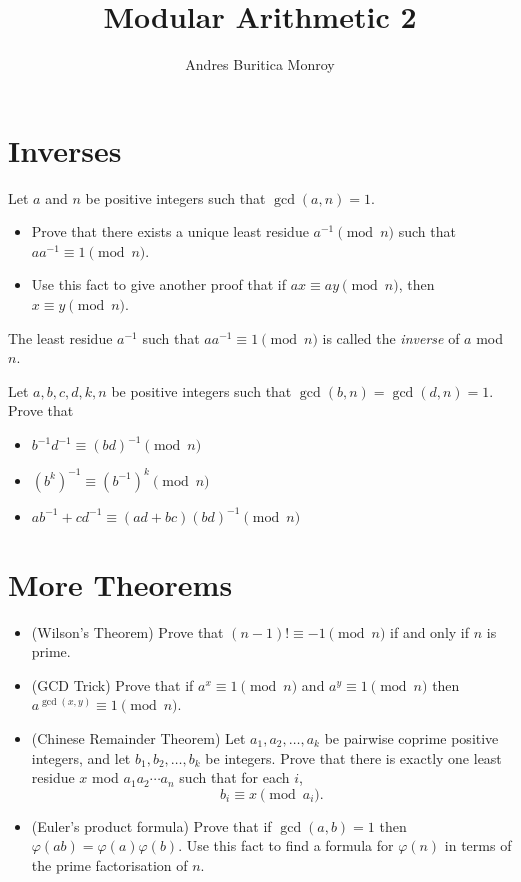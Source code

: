 \documentclass{article}
\title{Modular Arithmetic 2}
\author{Andres Buritica Monroy}
\date{}
\begin{document}
\maketitle
\section{Inverses}
  Let $a$ and $n$ be positive integers such that $\gcd(a,n)=1$.
  \begin{itemize}
    \item Prove that there exists a unique least residue $a^{-1}\pmod n$ such that
      $aa^{-1}\equiv 1\pmod n$.
    \item Use this fact to give another proof that if $ax\equiv ay\pmod n$, then
      $x\equiv y\pmod n$.
  \end{itemize}
  The least residue $a^{-1}$ such that $aa^{-1}\equiv 1\pmod n$ is called the \emph{inverse} of
  $a$ mod $n$.

  Let $a,b,c,d,k,n$ be positive integers such that
      $\gcd(b,n)=\gcd(d,n)=1$. Prove that
  \begin{itemize}
    \item $b^{-1}d^{-1}\equiv (bd)^{-1}\pmod n$
    \item $(b^k)^{-1}\equiv (b^{-1})^k\pmod n$
    \item $ab^{-1}+cd^{-1}\equiv (ad+bc)(bd)^{-1}\pmod n$
  \end{itemize}
\section{More Theorems}
\begin{itemize}
  \item (Wilson's Theorem) Prove that $(n-1)!\equiv -1\pmod n$ if and only if $n$ is prime.
  \item (GCD Trick) Prove that if $a^x\equiv 1\pmod n$ and $a^y\equiv 1\pmod n$ then
    $a^{\gcd(x,y)}\equiv 1\pmod n$.
  \item (Chinese Remainder Theorem) Let $a_1,a_2,\ldots,a_k$ be pairwise coprime positive integers, and let
    $b_1,b_2,\ldots,b_k$ be integers. Prove that there is exactly one least
    residue $x$ mod $a_1a_2\cdots a_n$ such that for each $i$,
    \[b_i\equiv x\pmod {a_i}.\]
  \item (Euler's product formula) Prove that if $\gcd(a,b)=1$ then $\varphi(ab)=\varphi(a)\varphi(b)$. Use
    this fact to find a formula for $\varphi(n)$ in terms of the prime
    factorisation of $n$.
\end{itemize}
\end{document}
